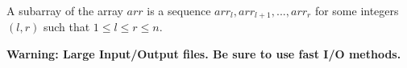 A subarray of the array $arr$ is a sequence $arr_l,  arr_{l  +  1},  ...,  arr_{r}$ for some integers $(l,  r)$ such that $1  \le  l  \le  r  \le  n$.

\textbf{Warning: Large Input/Output files. Be sure to use fast I/O methods.}
